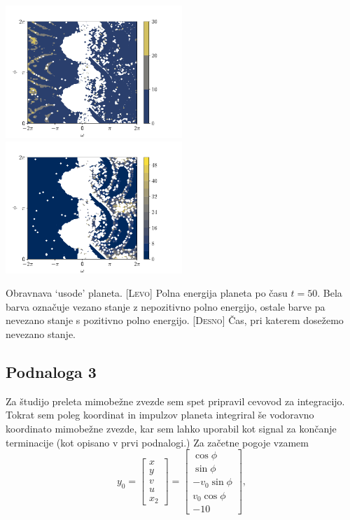 \begin{center}
    \includegraphics[width=0.5\textwidth]{../images/2-3-fazni-prostor-.pdf}\hfill
    \includegraphics[width=0.5\textwidth]{../images/2-3-escape_time.pdf}
    {Obravnava `usode' planeta. [\textsc{Levo}] Polna energija planeta po času $t=50$.
        Bela barva označuje vezano stanje z nepozitivno polno energijo, ostale barve
        pa nevezano stanje s pozitivno polno energijo. [\textsc{Desno}] Čas, pri
        katerem  dosežemo nevezano stanje.

    }
\end{center}




\subsection{Podnaloga 3}

Za študijo preleta mimobežne zvezde sem spet pripravil cevovod za integracijo.
Tokrat sem poleg koordinat in impulzov planeta integriral še vodoravno
koordinato mimobežne zvezde, kar sem lahko uporabil kot signal za končanje
terminacije (kot opisano v prvi podnalogi.) Za začetne pogoje vzamem
\[
    y_0 =
    \begin{bmatrix}
        x \\
        y \\
        v \\
        u \\
        x_2
    \end{bmatrix} =
    \begin{bmatrix}
        \cos{\phi}        \\
        \sin{\phi}        \\
        - v_0  \sin{\phi} \\
        v_0    \cos{\phi} \\
        -10
    \end{bmatrix},
\]

